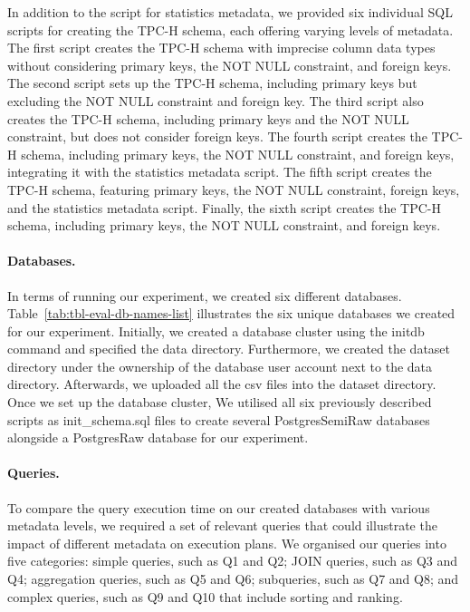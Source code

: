 

In addition to the script for statistics metadata, we provided six individual SQL scripts for creating the TPC-H schema, each offering varying levels of metadata. The first script creates the TPC-H schema with imprecise column data types without considering primary keys, the NOT NULL constraint, and foreign keys. The second script sets up the TPC-H schema, including primary keys but excluding the NOT NULL constraint and foreign key. The third script also creates the TPC-H schema, including primary keys and the NOT NULL constraint, but does not consider foreign keys. The fourth script creates the TPC-H schema, including primary keys, the NOT NULL constraint, and foreign keys, integrating it with the statistics metadata script. The fifth script creates the TPC-H schema, featuring primary keys, the NOT NULL constraint, foreign keys, and the statistics metadata script. Finally, the sixth script creates the TPC-H schema, including primary keys, the NOT NULL constraint, and foreign keys.

\paragraph{Databases.}
\label{par:eval-database}
In terms of running our experiment, we created six different databases. Table~\ref{tab:tbl-eval-db-names-list} illustrates the six unique databases we created for our experiment. Initially, we created a database cluster using the initdb command and specified the data directory. Furthermore, we created the dataset directory under the ownership of the database user account next to the data directory. Afterwards, we uploaded all the \acrshort{csv} files into the dataset directory. Once we set up the database cluster, We utilised all six previously described scripts as init\_schema.sql files to create several PostgresSemiRaw databases alongside a PostgresRaw database for our experiment.



\paragraph{Queries.}
\label{par:eval-queries}
To compare the query execution time on our created databases with various metadata levels, we required a set of relevant queries that could illustrate the impact of different metadata on execution plans. We organised our queries into five categories: simple queries, such as Q1 and Q2; JOIN queries, such as Q3 and Q4; aggregation queries, such as Q5 and Q6; subqueries, such as Q7 and Q8; and complex queries, such as Q9 and Q10 that include sorting and ranking.

